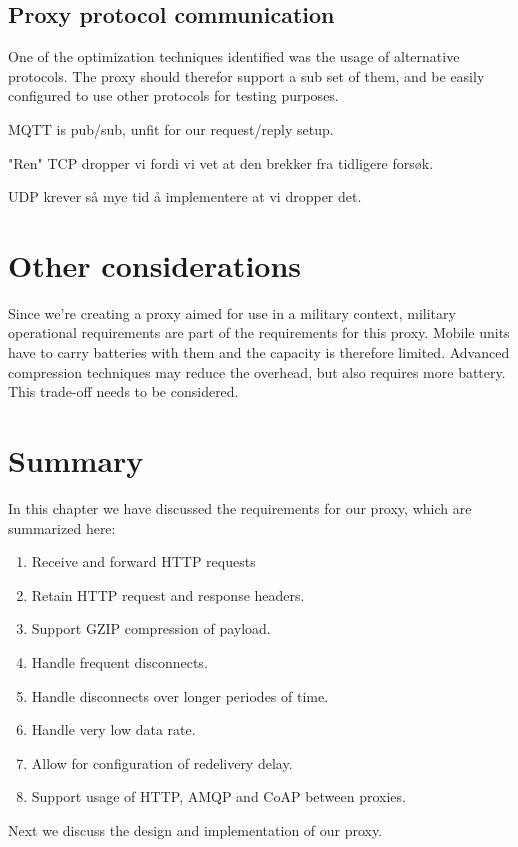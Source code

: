 \subsection{Proxy protocol communication}

One of the optimization techniques identified was the usage of alternative
protocols. The proxy should therefor support a sub set of them, and be easily
configured to use other protocols for testing purposes.

MQTT is pub/sub, unfit for our request/reply setup.

"Ren" TCP dropper vi fordi vi vet at den brekker fra tidligere forsøk.

UDP krever så mye tid å implementere at vi dropper det.


\section{Other considerations}

Since we're creating a proxy aimed for use in a military context, military
operational requirements are part of the requirements for this proxy. Mobile
units have to carry batteries with them and the capacity is therefore limited.
Advanced compression techniques may reduce the overhead, but also requires more
battery. This trade-off needs to be considered.


\section{Summary}

In this chapter we have discussed the requirements for our proxy, which are
summarized here:

\begin{enumerate}
    \item Receive and forward HTTP requests
    \item Retain HTTP request and response headers.
    \item Support GZIP compression of payload.
    \item Handle frequent disconnects.
    \item Handle disconnects over longer periodes of time.
    \item Handle very low data rate.
    \item Allow for configuration of redelivery delay.
    \item Support usage of HTTP, AMQP and CoAP between proxies.
\end{enumerate}

Next we discuss the design and implementation of our proxy.
